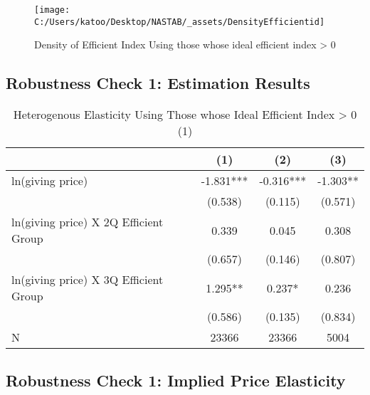 \documentclass[ review  , 3p ]{elsarticle}
\begin{document}
  \begin{figure}

  {\centering \texttt{[image: C:/Users/katoo/Desktop/NASTAB/\_assets/DensityEfficientid]} 

  }

  \caption{Density of Efficient Index Using those whose ideal efficient index > 0}\label{fig:unnamed-chunk-2}
  \end{figure}

  \hypertarget{robustness-check-1-estimation-results}{%
  \subsection{Robustness Check 1: Estimation Results}\label{robustness-check-1-estimation-results}}

  \begin{table}

  \caption{\label{tab:kableSubsetHeteroElasticitySlide1}Heterogenous Elasticity Using Those whose Ideal Efficient Index > 0 (1)}
  \centering
  \fontsize{8}{10}\selectfont
  \begin{tabular}[t]{lccc}
  \toprule
   & (1) & (2) & (3)\\
  \midrule
  ln(giving price) & -1.831*** & -0.316*** & -1.303**\\
   & (0.538) & (0.115) & (0.571)\\
  ln(giving price) X 2Q Efficient Group & 0.339 & 0.045 & 0.308\\
   & (0.657) & (0.146) & (0.807)\\
  ln(giving price) X 3Q Efficient Group & 1.295** & 0.237* & 0.236\\
   & (0.586) & (0.135) & (0.834)\\
  N & 23366 & 23366 & 5004\\
  \bottomrule
  \end{tabular}
  \end{table}

  \hypertarget{robustness-check-1-implied-price-elasticity}{%
  \subsection{Robustness Check 1: Implied Price Elasticity}\label{robustness-check-1-implied-price-elasticity}}
\end{document}
